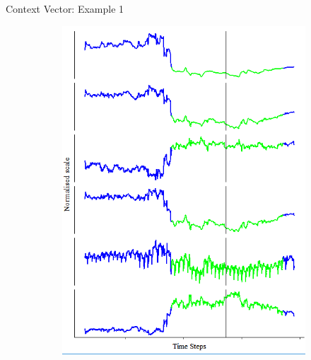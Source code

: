 \documentclass{beamer}
\begin{document}
\begin{frame}[shrink]{Context Vector: Example 1}
\begin{figure}[H]
\begin{subfigure}[b]{0.25\textwidth}
		\includegraphics[width=\textwidth]{context_timeline_2.png}
		\label{fig:context_timeline_2}
	\end{subfigure}
	

\end{figure}
\end{frame}
\end{document}
